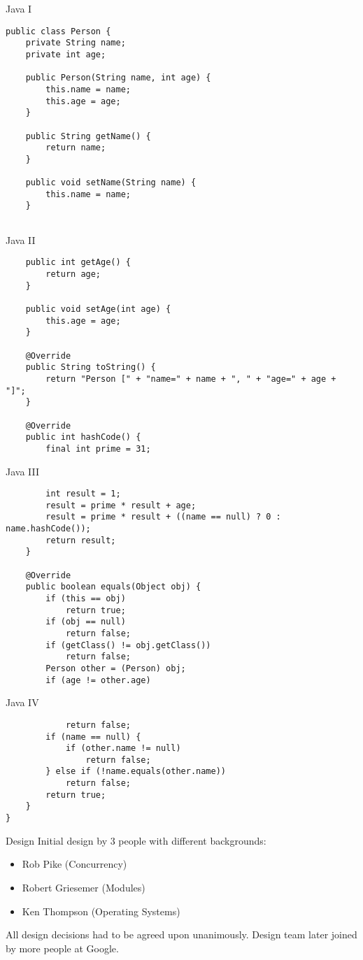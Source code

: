 \documentclass[10pt]{beamer}
\begin{document}
	\begin{frame}[t,fragile]{Java I}
		\begin{verbatim}
public class Person {
	private String name;
	private int age;
	
	public Person(String name, int age) {
		this.name = name;
		this.age = age;
	}
	
	public String getName() {
		return name;
	}
	
	public void setName(String name) {
		this.name = name;
	}
	
		\end{verbatim}
\end{frame}
	\begin{frame}[t,fragile]{Java II}
		\begin{verbatim}
	public int getAge() {
		return age;
	}
	
	public void setAge(int age) {
		this.age = age;
	}
	
	@Override
	public String toString() {
		return "Person [" + "name=" + name + ", " +	"age=" + age + "]";
	}
	
	@Override
	public int hashCode() {
		final int prime = 31;
		\end{verbatim}
\end{frame}
	\begin{frame}[t,fragile]{Java III}
		\begin{verbatim}
		int result = 1;
		result = prime * result + age;
		result = prime * result + ((name == null) ? 0 : name.hashCode());
		return result;
	}
	
	@Override
	public boolean equals(Object obj) {
		if (this == obj)
			return true;
		if (obj == null)
			return false;
		if (getClass() != obj.getClass())
			return false;
		Person other = (Person) obj;
		if (age != other.age)
		\end{verbatim}
\end{frame}
	\begin{frame}[t,fragile]{Java IV}
		\begin{verbatim}
			return false;
		if (name == null) {
			if (other.name != null)
				return false;
		} else if (!name.equals(other.name))
			return false;
		return true;
	}
}
		\end{verbatim}
\end{frame}
	

	\begin{frame}{Design}
		Initial design by 3 people with different backgrounds:
		\begin{itemize}
			\item Rob Pike (Concurrency)
			\item Robert Griesemer (Modules)
			\item Ken Thompson (Operating Systems)
		\end{itemize}
		All design decisions had to be agreed upon unanimously.
		Design team later joined by more people at Google.
	\end{frame}
	
\end{document}
